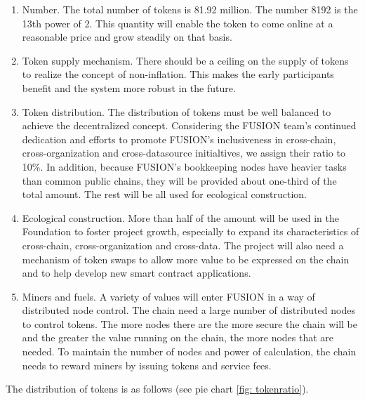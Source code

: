 \documentclass[a4paper,12pt]{article}
\begin{document}
\begin{enumerate}
\item Number. The total number of tokens is 81.92 million. The number 8192 is the 13th power of 2. This quantity will enable the token to come online at a reasonable price and grow steadily on that basis.
\item Token supply mechanism. There should be a ceiling on the supply of tokens to realize the concept of non-inflation. This makes the early participants benefit and the system more robust in the future.
\item Token distribution. The distribution of tokens must be well balanced to achieve the decentralized concept. Considering the FUSION team's continued dedication and efforts to promote FUSION's inclusiveness in cross-chain, cross-organization and cross-datasource initialtives, we assign their ratio to 10\%. In addition, because FUSION's bookkeeping nodes have heavier tasks than common public chains, they will be provided about one-third of the total amount. The rest will be all used for ecological construction.
\item Ecological construction. More than half of the amount will be used in the Foundation to foster project growth, especially to expand its characteristics of cross-chain, cross-organization and cross-data. The project will also need a mechanism of token swaps to allow more value to be expressed on the chain and to help develop new smart contract applications.
\item Miners and fuels. A variety of values will enter FUSION in a way of distributed node control. The chain need a large number of distributed nodes to control tokens. The more nodes there are the more secure the chain will be and the greater the value running on the chain, the more nodes that are needed. To maintain the number of nodes and power of calculation, the chain needs to reward miners by issuing tokens and service fees.

\end{enumerate}

The distribution of tokens is as follows (see pie chart \ref{fig: tokenratio}).
\end{document}
